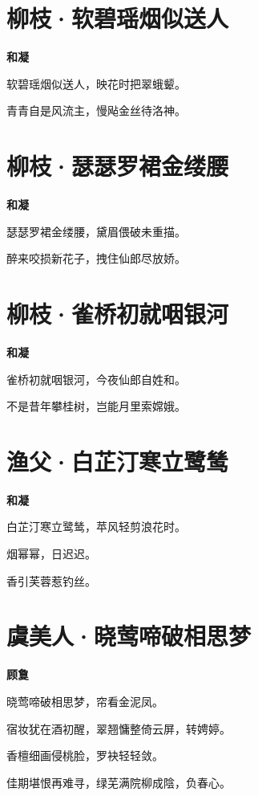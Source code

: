 \documentclass[12pt,a4paper]{ctexbook}
\begin{document}
\section{柳枝·软碧瑶烟似送人}
\textbf{和凝}\par\vspace{0.5em}
软碧瑶烟似送人，映花时把翠蛾颦。\par
青青自是风流主，慢飐金丝待洛神。\par

\section{柳枝·瑟瑟罗裙金缕腰}
\textbf{和凝}\par\vspace{0.5em}
瑟瑟罗裙金缕腰，黛眉偎破未重描。\par
醉来咬损新花子，拽住仙郎尽放娇。\par

\section{柳枝·雀桥初就咽银河}
\textbf{和凝}\par\vspace{0.5em}
雀桥初就咽银河，今夜仙郎自姓和。\par
不是昔年攀桂树，岂能月里索嫦娥。\par

\section{渔父·白芷汀寒立鹭鸶}
\textbf{和凝}\par\vspace{0.5em}
白芷汀寒立鹭鸶，苹风轻剪浪花时。\par
烟幂幂，日迟迟。\par
香引芙蓉惹钓丝。\par

\section{虞美人·晓莺啼破相思梦}
\textbf{顾敻}\par\vspace{0.5em}
晓莺啼破相思梦，帘看金泥凤。\par
宿妆犹在酒初醒，翠翘慵整倚云屏，转娉婷。\par
香檀细画侵桃脸，罗袂轻轻敛。\par
佳期堪恨再难寻，绿芜满院柳成陰，负春心。\par
\end{document}
